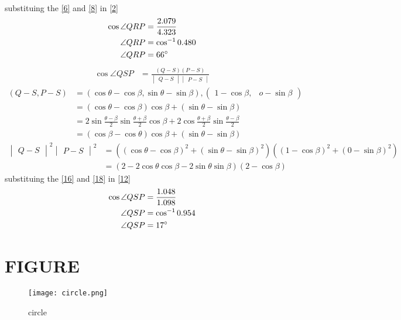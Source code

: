 \documentclass[12pt]{article}
\newcommand{\mydet}[1]{\ensuremath{\begin{vmatrix}#1\end{vmatrix}}}
\newcommand{\myvec}[1]{\ensuremath{\begin{pmatrix}#1\end{pmatrix}}}
\begin{document}
\begin{enumerate}
\begin{align}
\end{align}
substituing the \eqref{6} and \eqref{8} in \eqref{2}
\begin{align}
\cos\angle QRP&=\frac{2.079}{4.323}\\
\angle QRP&=\cos^{-1}0.480\\
\angle QRP&=66\degree
\end{align}
\begin{align}
\cos\angle QSP&= \frac{ (Q-S) (P-S)}{\mydet{Q-S}\mydet{P-S}}\label{12}
\end{align}
\begin{align}
(Q-S, P-S) &= (\cos\theta-\cos\beta,\sin\theta-\sin\beta),\myvec{1-\cos\beta,& o-\sin\beta}\\
&=(\cos\theta-\cos\beta)\cos\beta+(\sin\theta-\sin\beta)\\
&=2\sin\frac{\theta-\beta}{2}\sin\frac{\theta+\beta}{2}\cos\beta+2\cos\frac{\theta+\beta}{2}\sin\frac{\theta-\beta}{2}\\
&=(\cos\beta-\cos\theta)\cos\beta+(\sin\theta-\sin\beta)\label{16}
\end{align}
\begin{align}
\mydet{Q-S}^2\mydet{P-S}^2 &= ((\cos\theta-\cos\beta)^2+(\sin\theta-\sin\beta)^2)
	((1-\cos\beta)^2+(0-\sin\beta)^2)\\
	&=(2-2\cos\theta\cos\beta-2\sin\theta\sin\beta)(2-\cos\beta)\label{18}
\end{align}
substituing the \eqref{16} and \eqref{18} in \eqref{12}
\begin{align}
\cos\angle QSP&=\frac{1.048}{1.098}\\
\angle QSP&=\cos^{-1}0.954\\
\angle QSP&=17\degree
\end{align}
\section{FIGURE}
\begin{figure}[h]
\centering
\texttt{[image: circle.png]}
\caption{circle}
		\label{fig:Figure}
\end{figure}
\end{enumerate}
\end{document}

